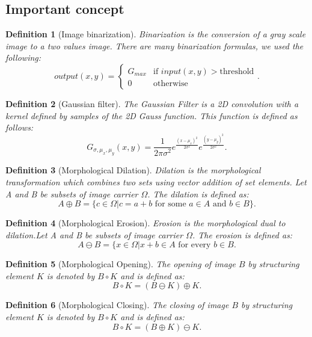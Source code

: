 \documentclass[10pt, conference]{IEEEtran}
\newtheorem{definition}{Definition}
\begin{document}
\subsection{Important concept}
\begin{definition}[Image binarization]
	Binarization is the conversion of a gray scale image to a two values image. There are many binarization formulas, we used the following:
	\[
		output(x,y) =
	\begin{cases}
		G_{max} & \text{if } input(x,y) > \text{threshold}\\
		0 & \text{otherwise}
	\end{cases}.
	\]
\end{definition}
\begin{definition}[Gaussian filter]
	The Gaussian Filter is a 2D convolution with a kernel defined by samples of the 2D Gauss function. This function is defined as follows:
			$$ G_{\sigma,\mu_{x},\mu_{y}}(x,y)=\frac{1}{2\pi\sigma^{2}}
			e^{\frac{(x-\mu_{x})^{2}}{2\sigma^{2}}}
			e^{\frac{(y-\mu_{y})^{2}}{2\sigma^{2}}}.$$
	
\end{definition}
\begin{definition}[Morphological Dilation]
	Dilation is the morphological transformation which combines two sets using vector addition of set elements. Let A and B be subsets of image carrier $\Omega$. The dilation is defined as: $$A \oplus B=\{c\in\Omega|c=a+b \text{ for some }a\in A\text{  and }b \in B\}.$$
\end{definition}

\begin{definition}[Morphological Erosion]
Erosion is the morphological dual to dilation.Let A and B be subsets of image carrier $\Omega$. The erosion is defined as: $$A \ominus B=\{x\in\Omega | x+b \in A \text{ for every }b\in B.$$
\end{definition}

\begin{definition}[Morphological Opening]
The opening of image $B$ by structuring	element $K$ is denoted by $B \circ K$ and is defined as: $$B \circ K =(B \ominus K) \oplus K.$$
\end{definition}

\begin{definition}[Morphological Closing]
The closing of image $B$ by structuring	element $K$ is denoted by $B \circ K$ and is defined as: $$B \circ K =(B \oplus K) \ominus K.$$
\end{definition}
\end{document}
